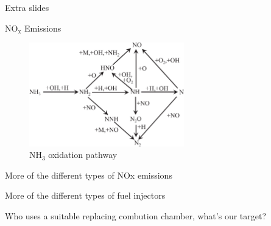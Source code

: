 \begin{frame}[standout]
    Extra slides
\end{frame}



\begin{frame}{$\mathrm{NO_x}$ Emissions}

    \begin{figure}[H]
        \centering
        \includegraphics[width=0.6\textwidth]{img/NOx-emission-diagram.jpg}
        \caption{$\mathrm{NH_3}$ oxidation pathway}
    \end{figure}

\end{frame}



\begin{frame}

    More of the different types of NOx emissions

    More of the different types of fuel injectors

    Who uses a suitable replacing combution chamber, what's our target?

\end{frame}